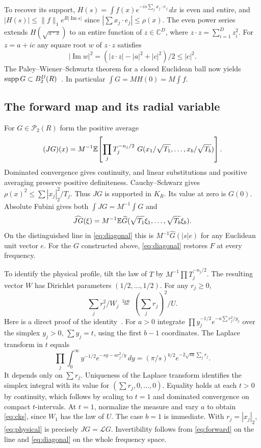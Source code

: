 \documentclass[11pt,a4paper]{article}
\numberwithin{equation}{section}
\begin{document}
To recover its support, $H(s)=\int f(x)e^{-is\sum_j x_j\cdot e_j}\,dx$ is even and entire, and $|H(s)|\le\|f\|_1e^{R|\operatorname{Im}s|}$ since $|\sum x_j\cdot e_j|\le\rho(x)$. The even power series extends $H(\sqrt{z\cdot z})$ to an entire function of $z\in\mathbb C^D$, where $z\cdot z=\sum_{i=1}^D z_i^2$. For $z=a+ic$ any square root $w$ of $z\cdot z$ satisfies
\[
 |\operatorname{Im}w|^2=(|z\cdot z|-|a|^2+|c|^2)/2\le |c|^2.
\]
The Paley--Wiener--Schwartz theorem for a closed Euclidean ball now yields $\operatorname{supp} G\subset B_2^D(R)$~\cite[Thm.~7.3.1]{Hormander}. In particular $\int G=M H(0)=M\int f$.

\subsection{The forward map and its radial variable}
For $G\in\mathcal P_2(R)$ form the positive average
\begin{equation}\label{eq:physical}
 (JG)(x)=M^{-1}\E\!\left[\prod_j T_j^{-n_j/2}\ G(x_1/\sqrt{T_1},\ldots,x_b/\sqrt{T_b})\right].
\end{equation}
Dominated convergence gives continuity, and linear substitutions and positive averaging preserve positive definiteness. Cauchy--Schwarz gives $\rho(x)^2\le\sum |x_j|_2^2/T_j$. Thus $JG$ is supported in $K_R$. Its value at zero is $G(0)$. Absolute Fubini gives both $\int JG=M^{-1}\int G$ and
\begin{equation}\label{eq:forward}
 \widehat {JG}(\xi)=M^{-1}\mathbb E\widehat G(\sqrt{T_1}\xi_1,\ldots,\sqrt{T_b}\xi_b).
\end{equation}
On the distinguished line in \eqref{eq:diagonal} this is $M^{-1}\widehat G(|s|e)$ for any Euclidean unit vector $e$. For the $G$ constructed above, \eqref{eq:diagonal} restores $F$ at every frequency.

To identify the physical profile, tilt the law of $T$ by $M^{-1}\prod T_j^{-n_j/2}$. The resulting vector $W$ has Dirichlet parameters $(1/2,\ldots,1/2)$. For any $r_j\ge0$,
\begin{equation}\label{eq:cks}
 \sum_j r_j^2/W_j\ \overset{\mathrm{law}}=\ \left(\sum_jr_j\right)^2/U .
\end{equation}
Here is a direct proof of the identity~\cite[Prop.~3.1]{CKS}. For $a>0$ integrate $\prod y_j^{-1/2}e^{-a\sum r_j^2/y_j}$ over the simplex $y_j>0$, $\sum y_j=t$, using the first $b-1$ coordinates. The Laplace transform in $t$ equals
\[
 \prod_j\int_0^\infty y^{-1/2}e^{-s y-a r_j^2/y}\,dy
     =(\pi/s)^{b/2}e^{-2\sqrt{sa}\sum_jr_j}.
\]
It depends only on $\sum r_j$. Uniqueness of the Laplace transform identifies the simplex integral with its value for $(\sum r_j,0,\ldots,0)$. Equality holds at each $t>0$ by continuity, which follows by scaling to $t=1$ and dominated convergence on compact $t$-intervals. At $t=1$, normalize the measure and vary $a$ to obtain \eqref{eq:cks}, since $W_1$ has the law of $U$. The case $b=1$ is immediate. With $r_j=|x_j|_2$, \eqref{eq:physical} is precisely $JG=\mathcal LG$. Invertibility follows from \eqref{eq:forward} on the line and \eqref{eq:diagonal} on the whole frequency space.
\end{document}
